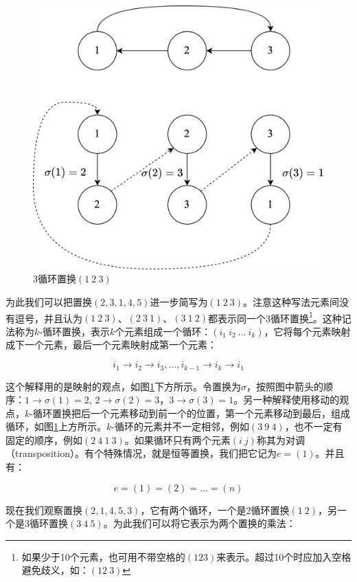 \documentclass[b5paper]{ctexart}
\begin{document}
\begin{figure}[htbp]
\centering
\includegraphics[scale=0.6]{img/3-cycle}
\caption{3循环置换$(1\ 2\ 3)$}
\label{fig:cycle-permutation}
\end{figure}

为此我们可以把置换$(2, 3, 1, 4, 5)$进一步简写为$(1\ 2\ 3)$。注意这种写法元素间没有逗号，并且认为$(1\ 2\ 3)$、$(2\ 3\ 1)$、$(3\ 1\ 2)$都表示同一个3循环置换\footnote{如果少于10个元素，也可用不带空格的$(123)$来表示。超过10个时应加入空格避免歧义，如：$(12\ 3)$}。这种记法称为$k$-循环置换，表示$k$个元素组成一个循环：$(i_1\ i_2\ ...\ i_k)$，它将每个元素映射成下一个元素，最后一个元素映射成第一个元素：

\[
i_1 \to i_2 \to i_3, ..., i_{k-1} \to i_k \to i_1
\]

这个解释用的是映射的观点，如图\ref{fig:cycle-permutation}下方所示。令置换为$\sigma$，按照图中箭头的顺序：$1 \to \sigma(1) = 2$, $2 \to \sigma(2) = 3$，$3 \to \sigma(3) = 1$。另一种解释使用移动的观点，$k$-循环置换把后一个元素移动到前一个的位置，第一个元素移动到最后，组成循环，如图\ref{fig:cycle-permutation}上方所示。$k$-循环的元素并不一定相邻，例如$(3\ 9\ 4)$，也不一定有固定的顺序，例如$(2\ 4\ 1\ 3)$。如果循环只有两个元素$(i\ j)$称其为对调（transposition）。有个特殊情况，就是恒等置换，我们把它记为$e = (1)$。并且有：

\[
e = (1) = (2) = ... = (n)
\]

现在我们观察置换$(2, 1, 4, 5, 3)$，它有两个循环，一个是2循环置换$(1\ 2)$，另一个是3循环置换$(3\ 4\ 5)$。为此我们可以将它表示为两个置换的乘法：
\end{document}
